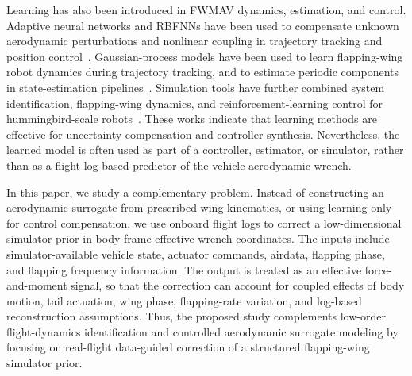 Learning has also been introduced in FWMAV dynamics, estimation, and control. Adaptive neural networks and RBFNNs have been used to compensate unknown aerodynamic perturbations and nonlinear coupling in trajectory tracking and position control~\cite{he_adaptive_2017,he_modeling_2021,qian_neural_2023}. Gaussian-process models have been used to learn flapping-wing robot dynamics during trajectory tracking, and to estimate periodic components in state-estimation pipelines~\cite{qian_learning_2023,qian_learning_2026}. Simulation tools have further combined system identification, flapping-wing dynamics, and reinforcement-learning control for hummingbird-scale robots~\cite{fei_flappy_2019}. These works indicate that learning methods are effective for uncertainty compensation and controller synthesis. Nevertheless, the learned model is often used as part of a controller, estimator, or simulator, rather than as a flight-log-based predictor of the vehicle aerodynamic wrench.

In this paper, we study a complementary problem. Instead of constructing an aerodynamic surrogate from prescribed wing kinematics, or using learning only for control compensation, we use onboard flight logs to correct a low-dimensional simulator prior in body-frame effective-wrench coordinates. The inputs include simulator-available vehicle state, actuator commands, airdata, flapping phase, and flapping frequency information. The output is treated as an effective force-and-moment signal, so that the correction can account for coupled effects of body motion, tail actuation, wing phase, flapping-rate variation, and log-based reconstruction assumptions. Thus, the proposed study complements low-order flight-dynamics identification and controlled aerodynamic surrogate modeling by focusing on real-flight data-guided correction of a structured flapping-wing simulator prior.
